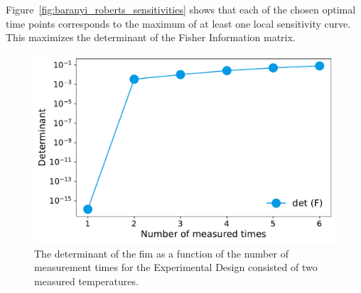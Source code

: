 \documentclass[10pt,A4paper]{article}
\begin{document}
Figure~\ref{fig:baranyi_roberts_sensitivities} shows that each of the chosen optimal time points corresponds to the maximum of at least one local sensitivity curve.
This maximizes the determinant of the Fisher Information matrix.
%
%
%
\begin{figure}[H]
    \centering
    \includegraphics[scale=0.4]{Figures/det_vs_ntimes.pdf}
    \caption{{\footnotesize The determinant of the \ac{fim} as a function of the number of measurement times for the Experimental Design consisted of two measured temperatures.}}
    \label{fig:det_vs_ntimes}
\end{figure}
%
%
%
\end{document}
